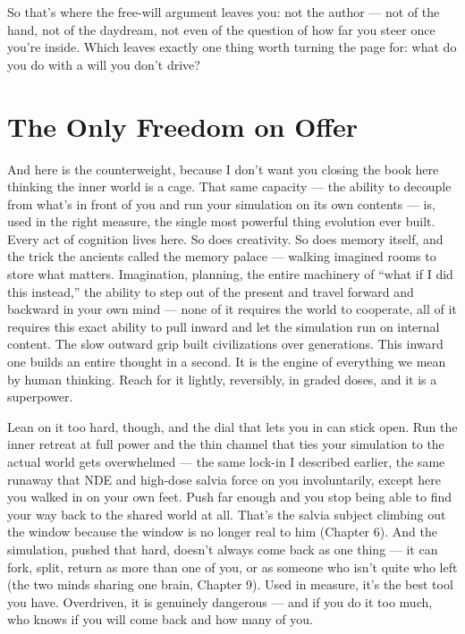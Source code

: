 \documentclass[11pt, twoside, openright]{book}
\begin{document}
So that's where the free-will argument leaves you: not the author --- not of the hand, not of the daydream, not even of the question of how far you steer once you're inside. Which leaves exactly one thing worth turning the page for: what do you do with a will you don't drive?


\chapter{The Only Freedom on Offer}

And here is the counterweight, because I don't want you closing the book here thinking the inner world is a cage. That same capacity --- the ability to decouple from what's in front of you and run your simulation on its own contents --- is, used in the right measure, the single most powerful thing evolution ever built. Every act of cognition lives here. So does creativity. So does memory itself, and the trick the ancients called the memory palace --- walking imagined rooms to store what matters. Imagination, planning, the entire machinery of ``what if I did this instead,'' the ability to step out of the present and travel forward and backward in your own mind --- none of it requires the world to cooperate, all of it requires this exact ability to pull inward and let the simulation run on internal content. The slow outward grip built civilizations over generations. This inward one builds an entire thought in a second. It is the engine of everything we mean by human thinking. Reach for it lightly, reversibly, in graded doses, and it is a superpower.

Lean on it too hard, though, and the dial that lets you in can stick open. Run the inner retreat at full power and the thin channel that ties your simulation to the actual world gets overwhelmed --- the same lock-in I described earlier, the same runaway that NDE and high-dose salvia force on you involuntarily, except here you walked in on your own feet. Push far enough and you stop being able to find your way back to the shared world at all. That's the salvia subject climbing out the window because the window is no longer real to him (Chapter 6). And the simulation, pushed that hard, doesn't always come back as one thing --- it can fork, split, return as more than one of you, or as someone who isn't quite who left (the two minds sharing one brain, Chapter 9). Used in measure, it's the best tool you have. Overdriven, it is genuinely dangerous --- and if you do it too much, who knows if you will come back and how many of you.
\end{document}
